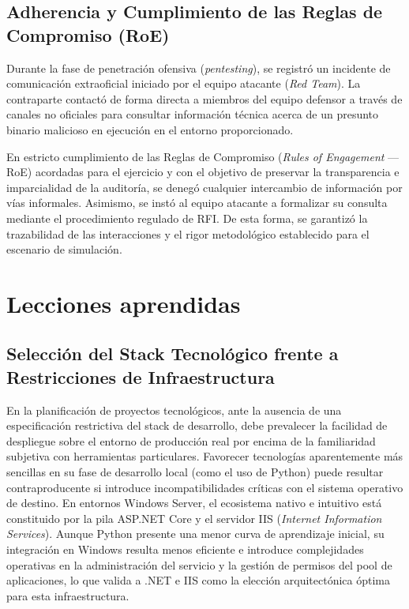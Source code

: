 \subsection*{Adherencia y Cumplimiento de las Reglas de Compromiso (RoE)}
Durante la fase de penetración ofensiva (\textit{pentesting}), se registró un incidente de comunicación extraoficial iniciado por el equipo atacante (\textit{Red Team}). La contraparte contactó de forma directa a miembros del equipo defensor a través de canales no oficiales para consultar información técnica acerca de un presunto binario malicioso en ejecución en el entorno proporcionado. 

En estricto cumplimiento de las Reglas de Compromiso (\textit{Rules of Engagement} --- RoE) acordadas para el ejercicio y con el objetivo de preservar la transparencia e imparcialidad de la auditoría, se denegó cualquier intercambio de información por vías informales. Asimismo, se instó al equipo atacante a formalizar su consulta mediante el procedimiento regulado de RFI. De esta forma, se garantizó la trazabilidad de las interacciones y el rigor metodológico establecido para el escenario de simulación.


\section[Lecciones Aprendidas]{Lecciones aprendidas}
\label{sec:lecciones_aprendidas}

\subsection*{Selección del Stack Tecnológico frente a Restricciones de Infraestructura}
En la planificación de proyectos tecnológicos, ante la ausencia de una especificación restrictiva del stack de desarrollo, debe prevalecer la facilidad de despliegue sobre el entorno de producción real por encima de la familiaridad subjetiva con herramientas particulares. Favorecer tecnologías aparentemente más sencillas en su fase de desarrollo local (como el uso de Python) puede resultar contraproducente si introduce incompatibilidades críticas con el sistema operativo de destino. En entornos Windows Server, el ecosistema nativo e intuitivo está constituido por la pila ASP.NET Core y el servidor IIS (\textit{Internet Information Services}). Aunque Python presente una menor curva de aprendizaje inicial, su integración en Windows resulta menos eficiente e introduce complejidades operativas en la administración del servicio y la gestión de permisos del pool de aplicaciones, lo que valida a .NET e IIS como la elección arquitectónica óptima para esta infraestructura.

